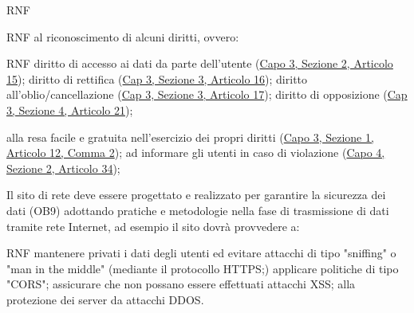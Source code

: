 \begin{listaPersonale}{RNF}
\begin{listaPersonale2}{RNF}
         al riconoscimento di alcuni diritti, ovvero:
        \begin{listaPersonale3}{RNF}
             diritto di accesso ai dati da parte dell'utente (\href{https://eur-lex.europa.eu/legal-content/IT/TXT/?uri=uriserv:OJ.L_.2016.119.01.0001.01.ITA&toc=OJ:L:2016:119:TOC#d1e2520-1-1}{Capo 3, Sezione 2, Articolo 15});
             diritto di rettifica (\href{https://eur-lex.europa.eu/legal-content/IT/TXT/?uri=uriserv:OJ.L_.2016.119.01.0001.01.ITA&toc=OJ:L:2016:119:TOC#d1e2606-1-1}{Cap 3, Sezione 3, Articolo 16});
            diritto all'oblio/cancellazione (\href{https://eur-lex.europa.eu/legal-content/IT/TXT/?uri=uriserv:OJ.L_.2016.119.01.0001.01.ITA&toc=OJ:L:2016:119:TOC#d1e2613-1-1}{Cap 3, Sezione 3, Articolo 17});
             diritto di opposizione (\href{https://eur-lex.europa.eu/legal-content/IT/TXT/?uri=uriserv:OJ.L_.2016.119.01.0001.01.ITA&toc=OJ:L:2016:119:TOC#d1e2810-1-1}{Cap 3, Sezione 4, Articolo 21});
        \end{listaPersonale3}

         alla resa facile e gratuita nell'esercizio dei propri diritti (\href{https://eur-lex.europa.eu/legal-content/IT/TXT/?uri=uriserv:OJ.L_.2016.119.01.0001.01.ITA&toc=OJ:L:2016:119:TOC#d1e2189-1-1}{Capo 3, Sezione 1, Articolo 12, Comma 2});
         ad informare gli utenti in caso di violazione (\href{https://eur-lex.europa.eu/legal-content/IT/TXT/?uri=uriserv:OJ.L_.2016.119.01.0001.01.ITA&toc=OJ:L:2016:119:TOC#d1e3497-1-1}{Capo 4, Sezione 2, Articolo 34});
    \end{listaPersonale2}


     Il sito di rete deve essere progettato e realizzato per garantire la sicurezza dei dati (OB9) adottando pratiche e metodologie nella fase di trasmissione di dati tramite rete Internet, ad esempio il sito dovrà provvedere a:
    \begin{listaPersonale2}{RNF}
         mantenere privati i dati degli utenti ed evitare attacchi di tipo "sniffing" o "man in the middle" (mediante il protocollo HTTPS;)
         applicare politiche di tipo "CORS";
         assicurare che non possano essere effettuati attacchi XSS;
         alla protezione dei server da attacchi DDOS.
    \end{listaPersonale2}


\end{listaPersonale}
